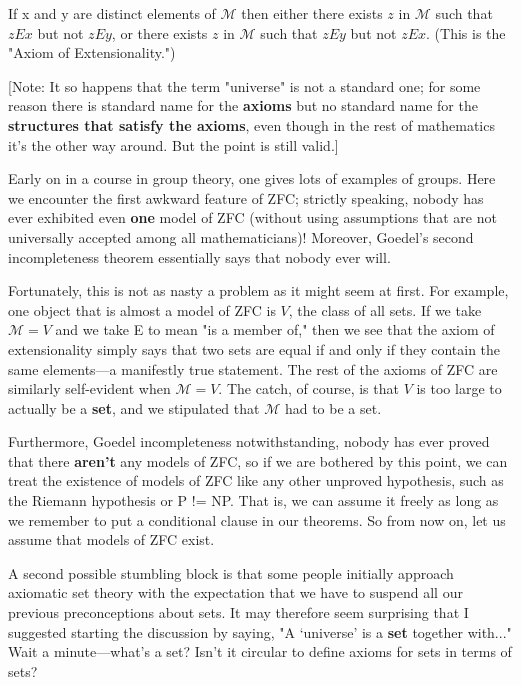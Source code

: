 \documentclass[10pt]{article}
\theoremstyle{definition}
\begin{document}
  If x and y are distinct elements of $\mathcal{M}$ then either there
  exists $z$ in $\mathcal{M}$ such that $z E x$ but not $z E y$, or there
  exists $z$ in $\mathcal{M}$ such that $z E y$ but not $z E x$.  (This is
  the "Axiom of Extensionality.")

[Note: It so happens that the term "universe" is not a standard one; for
some reason there is standard name for the \textbf{axioms} but no standard name for
the \textbf{structures that satisfy the axioms}, even though in the rest of
mathematics it's the other way around.  But the point is still valid.]

Early on in a course in group theory, one gives lots of examples of groups.
Here we encounter the first awkward feature of ZFC; strictly speaking,
nobody has ever exhibited even \textbf{one} model of ZFC (without using assumptions
that are not universally accepted among all mathematicians)!  Moreover,
Goedel's second incompleteness theorem essentially says that nobody ever
will.

Fortunately, this is not as nasty a problem as it might seem at first.  For
example, one object that is almost a model of ZFC is $V$, the class of all
sets.  If we take $\mathcal{M} = V$ and we take E to mean "is a member of," then we see
that the axiom of extensionality simply says that two sets are equal if and
only if they contain the same elements---a manifestly true statement.  The
rest of the axioms of ZFC are similarly self-evident when $\mathcal{M} = V$.  The catch,
of course, is that $V$ is too large to actually be a \textbf{set}, and we stipulated
that $\mathcal{M}$ had to be a set.

Furthermore, Goedel incompleteness notwithstanding, nobody has ever proved
that there \textbf{aren't} any models of ZFC, so if we are bothered by this point,
we can treat the existence of models of ZFC like any other unproved
hypothesis, such as the Riemann hypothesis or P != NP.  That is, we can
assume it freely as long as we remember to put a conditional clause in our
theorems.  So from now on, let us assume that models of ZFC exist.

A second possible stumbling block is that some people initially approach
axiomatic set theory with the expectation that we have to suspend all our
previous preconceptions about sets.  It may therefore seem surprising that
I suggested starting the discussion by saying, "A `universe' is a \textbf{set}
together with..."  Wait a minute---what's a set?  Isn't it circular to
define axioms for sets in terms of sets?
\end{document}
